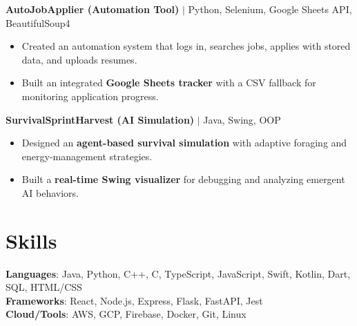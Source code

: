 \documentclass{resume}
\begin{document}
\textbf{AutoJobApplier (Automation Tool)} $|$ Python, Selenium, Google Sheets API, BeautifulSoup4
\begin{itemize}
    \item Created an automation system that logs in, searches jobs, applies with stored data, and uploads resumes.
    \item Built an integrated \textbf{Google Sheets tracker} with a CSV fallback for monitoring application progress.
\end{itemize}

\textbf{SurvivalSprintHarvest (AI Simulation)} $|$ Java, Swing, OOP
\begin{itemize}
    \item Designed an \textbf{agent-based survival simulation} with adaptive foraging and energy-management strategies.
    \item Built a \textbf{real-time Swing visualizer} for debugging and analyzing emergent AI behaviors.
\end{itemize}

\section{Skills}
\textbf{Languages}: Java, Python, C++, C, TypeScript, JavaScript, Swift, Kotlin, Dart, SQL, HTML/CSS\\
\textbf{Frameworks}: React, Node.js, Express, Flask, FastAPI, Jest\\
\textbf{Cloud/Tools}: AWS, GCP, Firebase, Docker, Git, Linux\\
\end{document}
